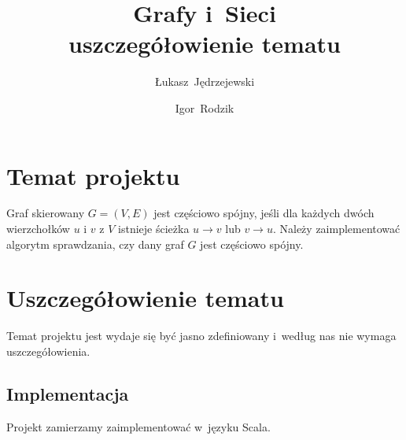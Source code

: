 \documentclass[a4paper,12pt]{mwart}
\title{
	Grafy i~Sieci \\
    uszczegółowienie tematu
}
\author{
	Łukasz~Jędrzejewski
    \and
	Igor~Rodzik
}
\date{}
\begin{document}
\maketitle

\section{Temat projektu}

Graf skierowany $G=(V,E)$ jest częściowo spójny, jeśli dla każdych dwóch
wierzchołków $u$ i $v$ z $V$ istnieje ścieżka $u \to v$ lub $v \to u$. Należy
zaimplementować algorytm sprawdzania, czy dany graf $G$ jest częściowo spójny.

\section{Uszczegółowienie tematu}

Temat projektu jest wydaje się być jasno zdefiniowany i~według nas nie wymaga
uszczegółowienia.

\subsection{Implementacja}

Projekt zamierzamy zaimplementować w~języku Scala.
\end{document}
